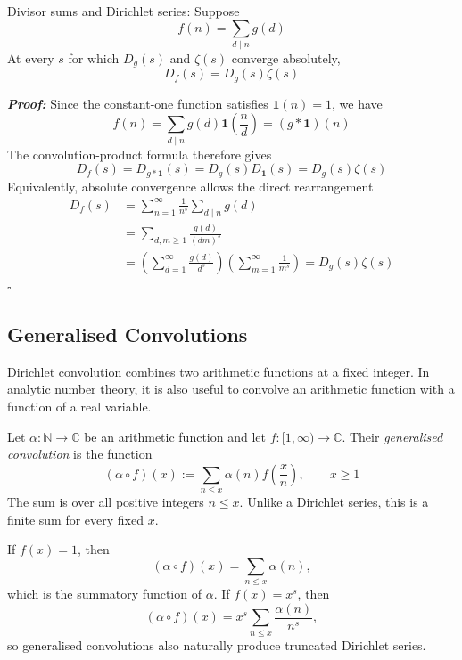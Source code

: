 \documentclass[a4paper,11pt,abstracton]{scrartcl}
\theoremstyle{dotlessP}
\theoremstyle{dotlessS}
\theoremstyle{remark}
\theoremstyle{definition}
\begin{document}
\begin{mainbox}{Divisor sums and Dirichlet series:}
Suppose
\[
    f(n)=\sum_{d\mid n}g(d)
\]
At every $s$ for which $D_g(s)$ and $\zeta(s)$ converge absolutely,
\[
    D_f(s)=D_g(s)\zeta(s)
\]
\end{mainbox}

\begin{claim_box}
\textbf{\textit{Proof:}}
Since the constant-one function satisfies $\mathbf{1}(n)=1$, we have
\[
    f(n)=\sum_{d\mid n}g(d)\mathbf{1}\!\left(\frac nd\right)
      =(g*\mathbf{1})(n)
\]
The convolution-product formula therefore gives
\[
    D_f(s)
      =D_{g*\mathbf{1}}(s)
      =D_g(s)D_{\mathbf{1}}(s)
      =D_g(s)\zeta(s)
\]
Equivalently, absolute convergence allows the direct rearrangement
\begin{align*}
    D_f(s)
      &=\sum_{n=1}^{\infty}\frac1{n^s}
        \sum_{d\mid n}g(d)\\
      &=\sum_{d,m\geq1}\frac{g(d)}{(dm)^s}\\
      &=\left(\sum_{d=1}^{\infty}\frac{g(d)}{d^s}\right)
        \left(\sum_{m=1}^{\infty}\frac1{m^s}\right)
       =D_g(s)\zeta(s)
\end{align*}
\hfill$\square$
\end{claim_box}

\subsection{Generalised Convolutions}

Dirichlet convolution combines two arithmetic functions at a fixed
integer. In analytic number theory, it is also useful to convolve an
arithmetic function with a function of a real variable.

\begin{definition_box}
Let $\alpha:\mathbb{N}\to\mathbb{C}$ be an arithmetic function and
let $f:[1,\infty)\to\mathbb{C}$. Their \emph{generalised convolution}
is the function
\[
    (\alpha\circ f)(x)
      :=\sum_{n\leq x}\alpha(n)f\!\left(\frac xn\right),
    \qquad x\geq1
\]
The sum is over all positive integers $n\leq x$. Unlike a Dirichlet
series, this is a finite sum for every fixed $x$.
\end{definition_box}

\begin{example_box}
If $f(x)=1$, then
\[
    (\alpha\circ f)(x)=\sum_{n\leq x}\alpha(n),
\]
which is the summatory function of $\alpha$. If $f(x)=x^s$, then
\[
    (\alpha\circ f)(x)
      =x^s\sum_{n\leq x}\frac{\alpha(n)}{n^s},
\]
so generalised convolutions also naturally produce truncated
Dirichlet series.
\end{example_box}
\end{document}
